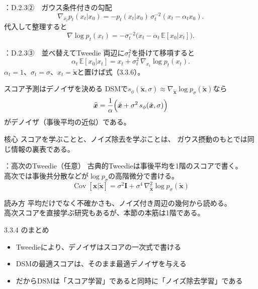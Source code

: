 \assuppl
\begin{frame}{\supplmark：D.2.3②　ガウス条件付きの勾配}
    \[
        \nabla_{x_t}p_t(x_t|x_0)
        =
        -
        p_t(x_t|x_0)\,
        \sigma_t^{-2}
        (x_t-\alpha_t x_0).
    \]
    代入して整理すると
    \[
        \nabla\log p_t(x_t)
        =
        -
        \sigma_t^{-2}
        \bigl(
        x_t
        -
        \alpha_t\,\mathbb{E}[x_0|x_t]
        \bigr).
    \]
\end{frame}
\assuppl
\begin{frame}{\supplmark：D.2.3③　並べ替えてTweedie}
    両辺に$\sigma_t^{2}$を掛けて移項すると
    \[
        \alpha_t\,\mathbb{E}[x_0|x_t]
        =
        x_t
        +
        \sigma_t^{2}\,
        \nabla_{x_t}\log p_t(x_t).
    \]
    $\alpha_t=1$、$\sigma_t=\sigma$、$x_t=\tilde{\bm{x}}$と置けば式（3.3.6）。
\end{frame}
\asmain
\begin{frame}{スコア予測はデノイザを決める}
    DSMで$s_\phi(\tilde{\bm{x}},\sigma)\approx\nabla_{\tilde{\bm{x}}}\log p_{\sigma}(\tilde{\bm{x}})$なら
    \[
        \widehat{\bm{x}}
        =
        \frac{1}{\alpha}
        \Bigl(
        \tilde{\bm{x}}
        +
        \sigma^{2}\,s_\phi(\tilde{\bm{x}},\sigma)
        \Bigr)
    \]
    がデノイザ（事後平均の近似）である。
    \begin{block}{核心}
        スコアを学ぶことと、ノイズ除去を学ぶことは、
        ガウス摂動のもとでは同じ情報の裏表である。
    \end{block}
\end{frame}
\assuppl
\begin{frame}{\supplmark：高次のTweedie（任意）}
    古典的Tweedieは事後平均を1階のスコアで書く。\\
    高次では事後共分散などが$\log p_{\sigma}$の高階微分で書ける。
    \[
        \operatorname{Cov}[\bm{x}|\tilde{\bm{x}}]
        =
        \sigma^{2}\bm{I}
        +
        \sigma^{4}\,
        \nabla_{\tilde{\bm{x}}}^{2}\log p_{\sigma}(\tilde{\bm{x}})
    \]
    \begin{exampleblock}{読み方}
        平均だけでなく不確かさも、ノイズ付き周辺の幾何から読める。\\
        高次スコアを直接学ぶ研究もあるが、本節の本筋は1階である。
    \end{exampleblock}
\end{frame}
\asmain
\begin{frame}{3.3.4 のまとめ}
    \begin{itemize}
        \item Tweedieにより、デノイザはスコアの一次式で書ける
        \item DSMの最適スコアは、そのまま最適デノイザを与える
        \item だからDSMは「スコア学習」であると同時に「ノイズ除去学習」である
    \end{itemize}
\end{frame}
